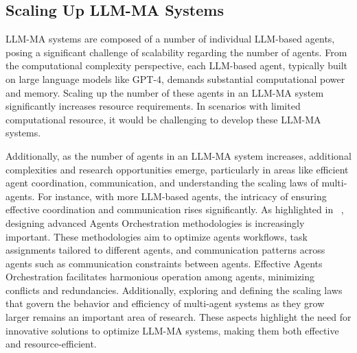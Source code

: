 \subsection{Scaling Up LLM-MA Systems}
\label{scale_up}

LLM-MA systems are composed of a number of individual LLM-based agents, posing a significant challenge of scalability regarding the number of agents. 
From the computational complexity perspective, each LLM-based agent, typically built on large language models like GPT-4, demands substantial computational power and memory. Scaling up the number of these agents in an LLM-MA system significantly increases  resource requirements. In scenarios with limited computational resource, it would be challenging to develop these LLM-MA systems.

Additionally, as the number of agents in an LLM-MA system increases, additional complexities and research opportunities emerge, particularly in areas like efficient agent coordination, communication, and understanding the scaling laws of multi-agents. For instance, with more LLM-based agents, the intricacy of ensuring effective coordination and communication rises significantly. 
{As highlighted in ~\cite{multiorches2}, designing advanced Agents Orchestration methodologies is increasingly important. These methodologies aim to optimize agents workflows, task assignments tailored to different agents, and communication patterns across agents such as communication constraints between agents. Effective Agents Orchestration facilitates harmonious operation among agents, minimizing conflicts and redundancies.}
Additionally, exploring and defining the scaling laws that govern the behavior and efficiency of multi-agent systems as they grow larger remains an important area of research. These aspects highlight the need for innovative solutions to optimize LLM-MA systems, making them both effective and resource-efficient.

